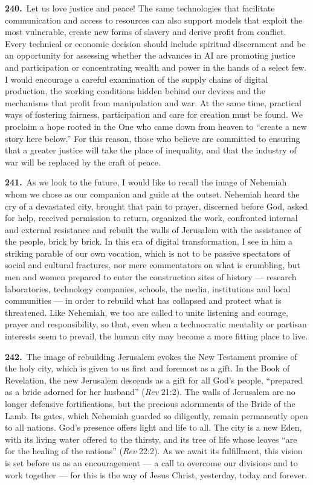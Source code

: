 \documentclass{article}
\begin{document}
\textbf{240.}\ Let us love justice and peace! The same technologies that facilitate communication and access to resources can also support models that exploit the most vulnerable, create new forms of slavery and derive profit from conflict. Every technical or economic decision should include spiritual discernment and be an opportunity for assessing whether the advances in AI are promoting justice and participation or concentrating wealth and power in the hands of a select few. I would encourage a careful examination of the supply chains of digital production, the working conditions hidden behind our devices and the mechanisms that profit from manipulation and war. At the same time, practical ways of fostering fairness, participation and care for creation must be found. We proclaim a hope rooted in the One who came down from heaven to ``create a new story here below.'' For this reason, those who believe are committed to ensuring that a greater justice will take the place of inequality, and that the industry of war will be replaced by the craft of peace.\cite{n221}

\textbf{241.}\ As we look to the future, I would like to recall the image of Nehemiah whom we chose as our companion and guide at the outset. Nehemiah heard the cry of a devastated city, brought that pain to prayer, discerned before God, asked for help, received permission to return, organized the work, confronted internal and external resistance and rebuilt the walls of Jerusalem with the assistance of the people, brick by brick. In this era of digital transformation, I see in him a striking parable of our own vocation, which is not to be passive spectators of social and cultural fractures, nor mere commentators on what is crumbling, but men and women prepared to enter the construction sites of history --- research laboratories, technology companies, schools, the media, institutions and local communities --- in order to rebuild what has collapsed and protect what is threatened. Like Nehemiah, we too are called to unite listening and courage, prayer and responsibility, so that, even when a technocratic mentality or partisan interests seem to prevail, the human city may become a more fitting place to live.

\textbf{242.}\ The image of rebuilding Jerusalem evokes the New Testament promise of the holy city, which is given to us first and foremost as a gift. In the Book of Revelation, the new Jerusalem descends as a gift for all God's people, ``prepared as a bride adorned for her husband'' (\emph{Rev} 21:2). The walls of Jerusalem are no longer defensive fortifications, but the precious adornments of the Bride of the Lamb. Its gates, which Nehemiah guarded so diligently, remain permanently open to all nations. God's presence offers light and life to all. The city is a new Eden, with its living water offered to the thirsty, and its tree of life whose leaves ``are for the healing of the nations'' (\emph{Rev} 22:2). As we await its fulfillment, this vision is set before us as an encouragement --- a call to overcome our divisions and to work together --- for this is the way of Jesus Christ, yesterday, today and forever.
\end{document}
